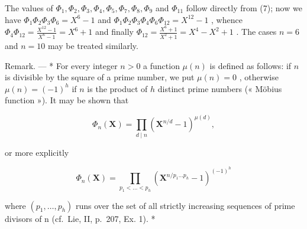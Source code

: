 The values of \(\Phi_1, \Phi_2, \Phi_3, \Phi_4, \Phi_5, \Phi_7, \Phi_8, \Phi_9\) and \(\Phi_{11}\) follow directly from (7); now we have \(\Phi_1\Phi_2\Phi_3\Phi_6 = X^6 - 1\) and \(\Phi_1\Phi_2\Phi_3\Phi_4\Phi_6\Phi_{12} = X^{12} - 1\) , whence \(\Phi_4\Phi_{12} = \frac{X^{12} - 1}{X^6 - 1} = X^6 + 1\) and finally \(\Phi_{12} = \frac{X^6 + 1}{X^2 + 1} = X^4 - X^2 + 1\) . The cases \(n = 6\) and \(n = 10\) may be treated similarly.

Remark. --- * For every integer \(n>0\) a function \(\mu(n)\) is defined as follows: if \(n\) is divisible by the square of a prime number, we put \(\mu(n)=0\) , otherwise \(\mu(n)=(-1)^{h}\) if \(n\) is the product of \(h\) distinct prime numbers (« Möbius function »). It may be shown that

\[
\Phi_ {n} (\mathbf {X}) = \prod_ {d \mid n} \left(\mathbf {X} ^ {n / d} - 1\right) ^ {\mu (d)},\tag{8}
\]

or more explicitly

\[
\Phi_ {n} (\mathbf {X}) = \prod_ {p _ {1} <   \dots <   p _ {h}} \left(\mathbf {X} ^ {n / p _ {1} \dots p _ {h}} - 1\right) ^ {(- 1) ^ {h}}\tag{9}
\]

where \((p_{1},\ldots,p_{h})\) runs over the set of all strictly increasing sequences of prime divisors of n (cf.~Lie, II, p.~207, Ex. 1). *

